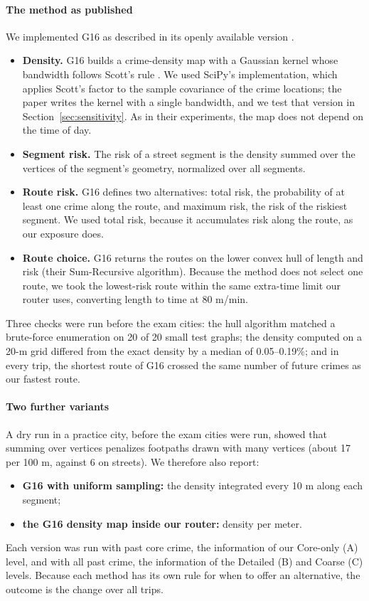 \documentclass[preprint,12pt,authoryear]{elsarticle}
\begin{document}
\paragraph{The method as published} We implemented G16 as described in its openly available version \citep{galbrun2014safe}.
\begin{itemize}
  \item \textbf{Density.} G16 builds a crime-density map with a Gaussian kernel whose bandwidth follows Scott's rule \citep{scott1992multivariate}. We used SciPy's implementation, which applies Scott's factor to the sample covariance of the crime locations; the paper writes the kernel with a single bandwidth, and we test that version in Section~\ref{sec:sensitivity}. As in their experiments, the map does not depend on the time of day.
  \item \textbf{Segment risk.} The risk of a street segment is the density summed over the vertices of the segment's geometry, normalized over all segments.
  \item \textbf{Route risk.} G16 defines two alternatives: total risk, the probability of at least one crime along the route, and maximum risk, the risk of the riskiest segment. We used total risk, because it accumulates risk along the route, as our exposure does.
  \item \textbf{Route choice.} G16 returns the routes on the lower convex hull of length and risk (their Sum-Recursive algorithm). Because the method does not select one route, we took the lowest-risk route within the same extra-time limit our router uses, converting length to time at 80 m/min.
\end{itemize}
Three checks were run before the exam cities: the hull algorithm matched a brute-force enumeration on 20 of 20 small test graphs; the density computed on a 20-m grid differed from the exact density by a median of 0.05--0.19\%; and in every trip, the shortest route of G16 crossed the same number of future crimes as our fastest route.

\paragraph{Two further variants} A dry run in a practice city, before the exam cities were run, showed that summing over vertices penalizes footpaths drawn with many vertices (about 17 per 100 m, against 6 on streets). We therefore also report:
\begin{itemize}
  \item \textbf{G16 with uniform sampling:} the density integrated every 10 m along each segment;
  \item \textbf{the G16 density map inside our router:} density per meter.
\end{itemize}
Each version was run with past core crime, the information of our Core-only (A) level, and with all past crime, the information of the Detailed (B) and Coarse (C) levels. Because each method has its own rule for when to offer an alternative, the outcome is the change over all trips.
\end{document}
